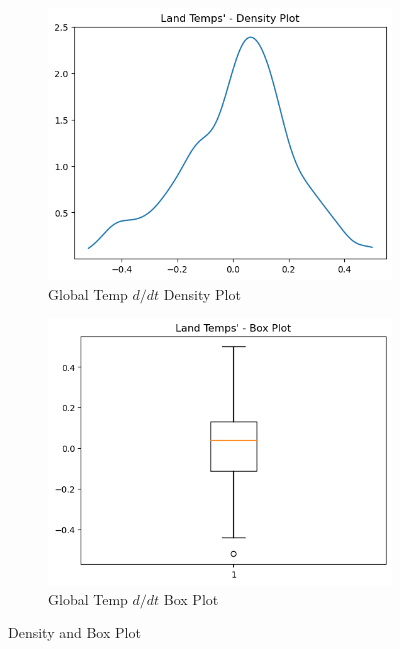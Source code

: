 \documentclass{article}
\begin{document}
\begin{figure}[htbp]
  \centering
  \begin{subfigure}[b]{0.45\textwidth}
    \includegraphics[width=\textwidth]{img/global_temp_dt/density_plot.png}
    \caption{Global Temp $d/dt$ Density Plot}
    \label{fig:global_temp_dtdensity}
  \end{subfigure}
  \hfill
  \begin{subfigure}[b]{0.45\textwidth}
    \includegraphics[width=\textwidth]{img/global_temp_dt/box_plot.png}
    \caption{Global Temp $d/dt$ Box Plot}
    \label{fig:global_temp_dtbox}
  \end{subfigure}
  \caption{Density and Box Plot}
  \label{fig:global_temp_dt2}
\end{figure}
\end{document}
